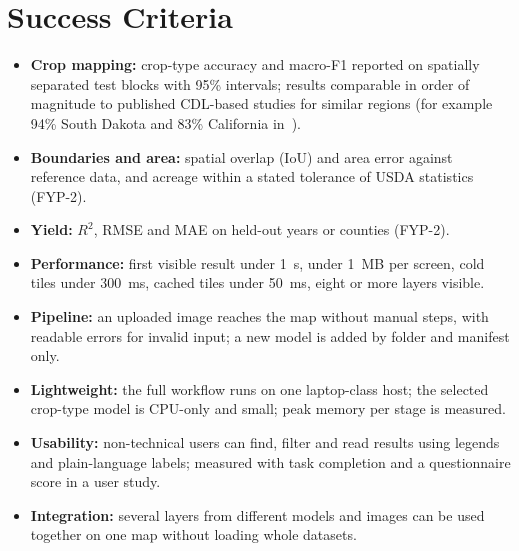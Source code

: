 \section{Success Criteria}
\begin{itemize}
  \item \textbf{Crop mapping:} crop-type accuracy and macro-F1 reported on spatially separated test
        blocks with 95\% intervals; results comparable in order of magnitude to published CDL-based
        studies for similar regions (for example 94\% South Dakota and 83\% California
        in~\cite{tran2022}).
  \item \textbf{Boundaries and area:} spatial overlap (IoU) and area error against reference data,
        and acreage within a stated tolerance of USDA statistics (FYP-2).
  \item \textbf{Yield:} $R^2$, RMSE and MAE on held-out years or counties (FYP-2).
  \item \textbf{Performance:} first visible result under 1~s, under 1~MB per screen, cold tiles
        under 300~ms, cached tiles under 50~ms, eight or more layers visible.
  \item \textbf{Pipeline:} an uploaded image reaches the map without manual steps, with readable
        errors for invalid input; a new model is added by folder and manifest only.
  \item \textbf{Lightweight:} the full workflow runs on one laptop-class host; the selected crop-type
        model is CPU-only and small; peak memory per stage is measured.
  \item \textbf{Usability:} non-technical users can find, filter and read results using legends and
        plain-language labels; measured with task completion and a questionnaire score in a user
        study.
  \item \textbf{Integration:} several layers from different models and images can be used together on
        one map without loading whole datasets.
\end{itemize}

